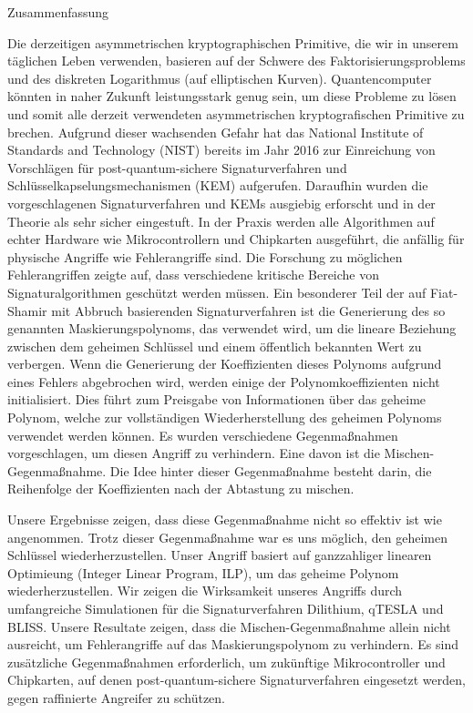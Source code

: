 \pagebreak
{}
{Zusammenfassung}
\label{sec:abstract-diff}
\\

Die derzeitigen asymmetrischen kryptographischen Primitive, die wir in unserem täglichen Leben verwenden, basieren auf der Schwere des Faktorisierungsproblems und des diskreten Logarithmus (auf elliptischen Kurven). 
Quantencomputer könnten in naher Zukunft leistungsstark genug sein, um diese Probleme zu lösen und somit alle derzeit verwendeten asymmetrischen kryptografischen Primitive zu brechen.
Aufgrund dieser wachsenden Gefahr hat das National Institute of Standards and Technology (NIST) bereits im Jahr 2016 zur Einreichung von Vorschlägen für post-quantum-sichere Signaturverfahren und Schlüsselkapselungsmechanismen (KEM) aufgerufen.  Daraufhin wurden die vorgeschlagenen Signaturverfahren und KEMs ausgiebig erforscht und in der Theorie als sehr sicher eingestuft.
In der Praxis werden alle Algorithmen auf echter Hardware wie Mikrocontrollern und Chipkarten ausgeführt, die anfällig für physische Angriffe wie Fehlerangriffe sind. Die Forschung zu möglichen Fehlerangriffen zeigte auf, dass verschiedene kritische Bereiche von Signaturalgorithmen geschützt werden müssen.
Ein besonderer Teil der auf Fiat-Shamir mit Abbruch basierenden Signaturverfahren ist die Generierung des so genannten Maskierungspolynoms, das verwendet wird, um die lineare Beziehung zwischen dem geheimen Schlüssel und einem öffentlich bekannten Wert zu verbergen.
Wenn die Generierung der Koeffizienten dieses Polynoms aufgrund eines Fehlers abgebrochen wird, werden einige der Polynomkoeffizienten nicht initialisiert. Dies führt zum Preisgabe von Informationen über das geheime Polynom, welche zur vollständigen Wiederherstellung des geheimen Polynoms verwendet werden können.
Es wurden verschiedene Gegenmaßnahmen vorgeschlagen, um diesen Angriff zu verhindern. Eine davon ist die Mischen-Gegenmaßnahme. Die Idee hinter dieser Gegenmaßnahme besteht darin, die Reihenfolge der Koeffizienten nach der Abtastung zu mischen.

Unsere Ergebnisse zeigen, dass diese Gegenmaßnahme nicht so effektiv ist wie angenommen. Trotz dieser Gegenmaßnahme war es uns möglich, den geheimen Schlüssel wiederherzustellen.
Unser Angriff basiert auf ganzzahliger linearen Optimieung (Integer Linear Program, ILP), um das geheime Polynom wiederherzustellen.
Wir zeigen die Wirksamkeit unseres Angriffs durch umfangreiche Simulationen für die Signaturverfahren Dilithium, qTESLA und BLISS.
Unsere Resultate zeigen, dass die Mischen-Gegenmaßnahme allein nicht ausreicht, um Fehlerangriffe auf das Maskierungspolynom zu verhindern. Es sind zusätzliche Gegenmaßnahmen erforderlich, um zukünftige Mikrocontroller und Chipkarten, auf denen post-quantum-sichere Signaturverfahren eingesetzt werden, gegen raffinierte Angreifer zu schützen.

